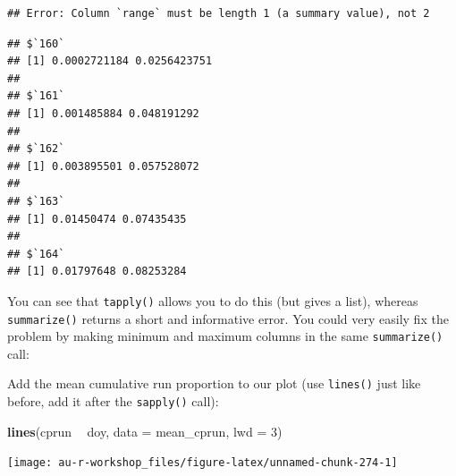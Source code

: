 \documentclass[]{book}
\newenvironment{Shaded}{\begin{snugshade}}{\end{snugshade}}
\newcommand{\CommentTok}[1]{\textcolor[rgb]{0.56,0.35,0.01}{\textit{#1}}}
\newcommand{\DataTypeTok}[1]{\textcolor[rgb]{0.13,0.29,0.53}{#1}}
\newcommand{\DecValTok}[1]{\textcolor[rgb]{0.00,0.00,0.81}{#1}}
\newcommand{\KeywordTok}[1]{\textcolor[rgb]{0.13,0.29,0.53}{\textbf{#1}}}
\newcommand{\NormalTok}[1]{#1}
\newcommand{\OperatorTok}[1]{\textcolor[rgb]{0.81,0.36,0.00}{\textbf{#1}}}
\newcommand{\StringTok}[1]{\textcolor[rgb]{0.31,0.60,0.02}{#1}}
\begin{document}
\begin{verbatim}
## Error: Column `range` must be length 1 (a summary value), not 2
\end{verbatim}

\begin{Shaded}
\end{Shaded}

\begin{verbatim}
## $`160`
## [1] 0.0002721184 0.0256423751
## 
## $`161`
## [1] 0.001485884 0.048191292
## 
## $`162`
## [1] 0.003895501 0.057528072
## 
## $`163`
## [1] 0.01450474 0.07435435
## 
## $`164`
## [1] 0.01797648 0.08253284
\end{verbatim}

You can see that \texttt{tapply()} allows you to do this (but gives a list), whereas \texttt{summarize()} returns a short and informative error. You could very easily fix the problem by making minimum and maximum columns in the same \texttt{summarize()} call:

\begin{Shaded}
\end{Shaded}

Add the mean cumulative run proportion to our plot (use \texttt{lines()} just like before, add it after the \texttt{sapply()} call):

\begin{Shaded}
\begin{Highlighting}[]
\KeywordTok{lines}\NormalTok{(cprun }\OperatorTok{~}\StringTok{ }\NormalTok{doy, }\DataTypeTok{data =}\NormalTok{ mean_cprun, }\DataTypeTok{lwd =} \DecValTok{3}\NormalTok{)}
\end{Highlighting}
\end{Shaded}

\begin{center}\texttt{[image: au-r-workshop\_files/figure-latex/unnamed-chunk-274-1]} \end{center}
\end{document}

